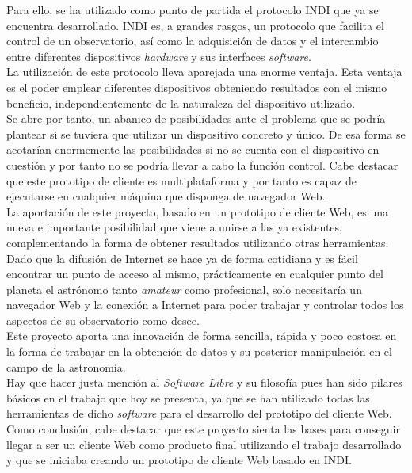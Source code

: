 Para ello, se ha utilizado como punto de partida el protocolo INDI que ya se encuentra desarrollado. INDI es, a grandes rasgos, un protocolo que facilita el control de un observatorio, así como la adquisición de datos y el intercambio entre diferentes dispositivos \textit{hardware} y sus interfaces \textit{software}.\\

La utilización de este protocolo lleva aparejada una enorme ventaja. Esta ventaja es el poder emplear diferentes dispositivos obteniendo resultados con el mismo beneficio, independientemente de la naturaleza del dispositivo utilizado.\\
Se abre por tanto, un abanico de posibilidades ante el problema que se podría plantear si se tuviera que utilizar un dispositivo concreto y único. De esa forma se acotarían enormemente las posibilidades si no se cuenta con el dispositivo en cuestión y por tanto no se podría llevar a cabo la función control. Cabe destacar que este prototipo de cliente es multiplataforma y por tanto es capaz de ejecutarse en cualquier máquina que disponga de navegador Web.\\

La aportación de este proyecto, basado en un prototipo de cliente Web, es una nueva e importante posibilidad  que viene a unirse a las ya existentes, complementando la forma de obtener resultados utilizando otras herramientas. \\

Dado que la difusión de Internet se hace ya de forma cotidiana y es fácil encontrar un punto de acceso al mismo, prácticamente en cualquier punto del planeta el astrónomo tanto \textit{amateur} como  profesional, solo necesitaría un navegador Web y la conexión a Internet para poder trabajar y controlar todos los aspectos de su observatorio como desee.\\

Este proyecto aporta una innovación de forma sencilla, rápida y poco costosa en la forma de trabajar en la obtención de datos y su posterior manipulación en el campo de la astronomía.\\

Hay que hacer justa mención al \textit{Software Libre} y su filosofía pues han sido pilares básicos en el trabajo que hoy se presenta, ya que se han utilizado todas las herramientas de dicho \textit{software} para el desarrollo del prototipo del cliente Web.\\

Como conclusión, cabe destacar que este proyecto sienta las bases para conseguir llegar a ser un cliente Web como producto final utilizando el trabajo desarrollado y que se iniciaba creando un prototipo de cliente Web basado en INDI. \\


